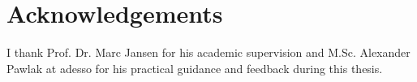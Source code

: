 \section*{Acknowledgements}

I thank Prof. Dr. Marc Jansen for his academic supervision and M.Sc. Alexander Pawlak at adesso for his practical guidance and feedback during this thesis.
